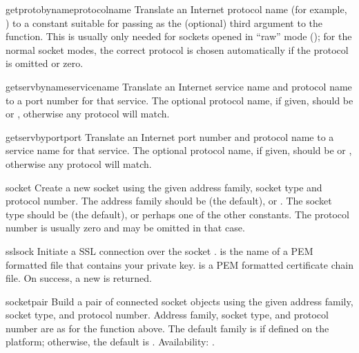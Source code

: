 \begin{funcdesc}{getprotobyname}{protocolname}
Translate an Internet protocol name (for example, ) to a constant
suitable for passing as the (optional) third argument to the
 function.  This is usually only needed for sockets
opened in ``raw'' mode (); for the normal socket
modes, the correct protocol is chosen automatically if the protocol is
omitted or zero.
\end{funcdesc}

\begin{funcdesc}{getservbyname}{servicename}
Translate an Internet service name and protocol name to a port number
for that service.  The optional protocol name, if given, should be
 or , otherwise any protocol will match.
\end{funcdesc}

\begin{funcdesc}{getservbyport}{port}
Translate an Internet port number and protocol name to a service name
for that service.  The optional protocol name, if given, should be
 or , otherwise any protocol will match.
\end{funcdesc}

\begin{funcdesc}{socket}{}
Create a new socket using the given address family, socket type and
protocol number.  The address family should be  (the
default),  or .  The socket type
should be  (the default), 
or perhaps one of the other  constants.  The protocol
number is usually zero and may be omitted in that case.
\end{funcdesc}

\begin{funcdesc}{ssl}{sock}
Initiate a SSL connection over the socket .  is
the name of a PEM formatted file that contains your private
key.  is a PEM formatted certificate chain file. On
success, a new  is returned.

\end{funcdesc}

\begin{funcdesc}{socketpair}{}
Build a pair of connected socket objects using the given address
family, socket type, and protocol number.  Address family, socket type,
and protocol number are as for the  function above.
The default family is  if defined on the platform;
otherwise, the default is .
Availability: \UNIX.  
\end{funcdesc}

